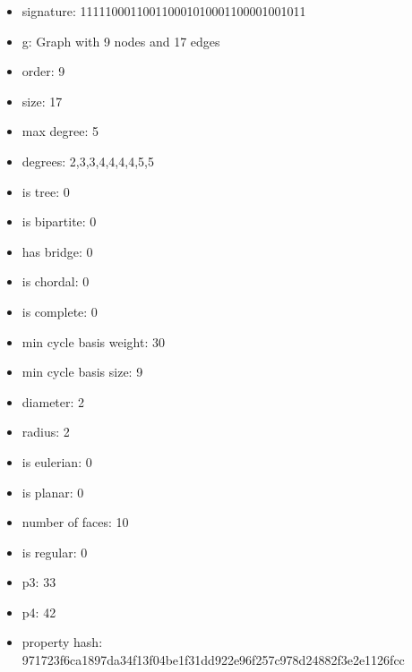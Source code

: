 \newpage
\begin{figure}
\end{figure}
\begin{itemize}
\item signature: 111110001100110001010001100001001011
\item g: Graph with 9 nodes and 17 edges
\item order: 9
\item size: 17
\item max degree: 5
\item degrees: 2,3,3,4,4,4,4,5,5
\item is tree: 0
\item is bipartite: 0
\item has bridge: 0
\item is chordal: 0
\item is complete: 0
\item min cycle basis weight: 30
\item min cycle basis size: 9
\item diameter: 2
\item radius: 2
\item is eulerian: 0
\item is planar: 0
\item number of faces: 10
\item is regular: 0
\item p3: 33
\item p4: 42
\item property hash: 971723f6ca1897da34f13f04be1f31dd922e96f257c978d24882f3e2e1126fcc
\end{itemize}
